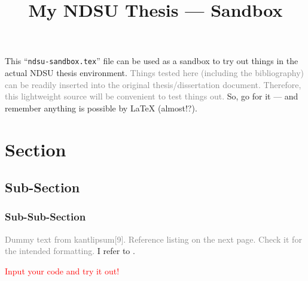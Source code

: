 \documentclass[12pt,chapterrefs]{ndsu-thesis-2022}
\title{My NDSU Thesis --- Sandbox}
\begin{document}

This ``\texttt{ndsu-sandbox.tex}'' file can be used as a sandbox to try out things in the actual NDSU thesis environment. \textcolor{gray}{Things tested here (including the bibliography) can be readily inserted into the original thesis/dissertation document. Therefore, this lightweight source will be convenient to test things out.} So, go for it --- and remember anything is possible by \LaTeX{} (almost!?).

\section{Section}
\subsection{Sub-Section}
\subsubsection{Sub-Sub-Section}

\textcolor{gray}{Dummy text from kantlipsum[9]. Reference listing on the next page. Check it for the intended formatting.} I refer to \citep{lamport94,kopka2004guide,baczkowski1990ndsu,cassuto2010advising,pires2021teens}. \kant[9]

\textcolor{red}{Input your code and try it out!}


\makerefs %


\closeappendices  %
\end{document}
